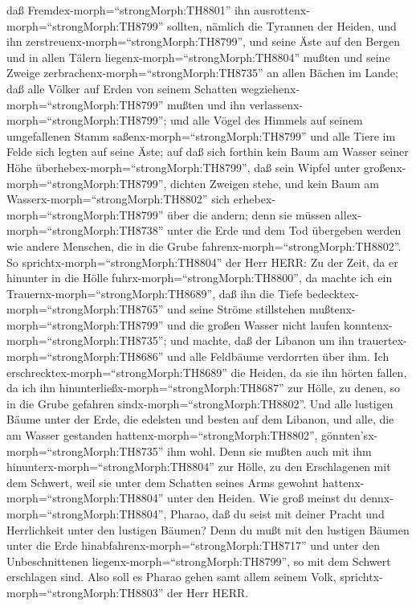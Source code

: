  daß Fremdex-morph=``strongMorph:TH8801'' ihn
ausrottenx-morph=``strongMorph:TH8799'' sollten, nämlich die Tyrannen
der Heiden, und ihn zerstreuenx-morph=``strongMorph:TH8799'', und seine
Äste auf den Bergen und in allen Tälern
liegenx-morph=``strongMorph:TH8804'' mußten und seine Zweige
zerbrachenx-morph=``strongMorph:TH8735'' an allen Bächen im Lande; daß
alle Völker auf Erden von seinem Schatten
wegziehenx-morph=``strongMorph:TH8799'' mußten und ihn
verlassenx-morph=``strongMorph:TH8799'';  und alle Vögel
des Himmels auf seinem umgefallenen Stamm
saßenx-morph=``strongMorph:TH8799'' und alle Tiere im Felde sich legten
auf seine Äste;  auf daß sich forthin kein Baum am Wasser
seiner Höhe überhebex-morph=``strongMorph:TH8799'', daß sein Wipfel
unter großenx-morph=``strongMorph:TH8799'', dichten Zweigen stehe, und
kein Baum am Wasserx-morph=``strongMorph:TH8802'' sich
erhebex-morph=``strongMorph:TH8799'' über die andern; denn sie müssen
allex-morph=``strongMorph:TH8738'' unter die Erde und dem Tod übergeben
werden wie andere Menschen, die in die Grube
fahrenx-morph=``strongMorph:TH8802''.  So
sprichtx-morph=``strongMorph:TH8804'' der Herr HERR: Zu der Zeit, da er
hinunter in die Hölle fuhrx-morph=``strongMorph:TH8800'', da machte ich
ein Trauernx-morph=``strongMorph:TH8689'', daß ihn die Tiefe
bedecktex-morph=``strongMorph:TH8765'' und seine Ströme stillstehen
mußtenx-morph=``strongMorph:TH8799'' und die großen Wasser nicht laufen
konntenx-morph=``strongMorph:TH8735''; und machte, daß der Libanon um
ihn trauertex-morph=``strongMorph:TH8686'' und alle Feldbäume verdorrten
über ihm.  Ich erschrecktex-morph=``strongMorph:TH8689''
die Heiden, da sie ihn hörten fallen, da ich ihn
hinunterließx-morph=``strongMorph:TH8687'' zur Hölle, zu denen, so in
die Grube gefahren sindx-morph=``strongMorph:TH8802''. Und alle lustigen
Bäume unter der Erde, die edelsten und besten auf dem Libanon, und alle,
die am Wasser gestanden hattenx-morph=``strongMorph:TH8802'',
gönnten'sx-morph=``strongMorph:TH8735'' ihm wohl.  Denn sie
mußten auch mit ihm hinunterx-morph=``strongMorph:TH8804'' zur Hölle, zu
den Erschlagenen mit dem Schwert, weil sie unter dem Schatten seines
Arms gewohnt hattenx-morph=``strongMorph:TH8804'' unter den Heiden.
 Wie groß meinst du dennx-morph=``strongMorph:TH8804'',
Pharao, daß du seist mit deiner Pracht und Herrlichkeit unter den
lustigen Bäumen? Denn du mußt mit den lustigen Bäumen unter die Erde
hinabfahrenx-morph=``strongMorph:TH8717'' und unter den Unbeschnittenen
liegenx-morph=``strongMorph:TH8799'', so mit dem Schwert erschlagen
sind. Also soll es Pharao gehen samt allem seinem Volk,
sprichtx-morph=``strongMorph:TH8803'' der Herr HERR.

